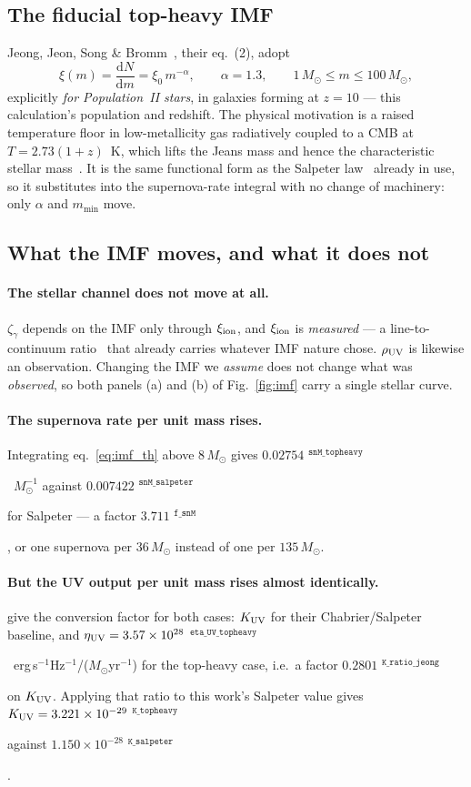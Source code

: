 \documentclass[11pt,a4paper]{article}
\newif\ifprovdraft
\newcommand{\src}[1]{%
  \ifprovdraft
    \ifmmode{}^{\text{\color{gray}\scriptsize\texttt{#1}}}%
    \else{\color{gray}\scriptsize$^{\texttt{#1}}$}%
    \fi
  \fi}
\begin{document}
\subsection{The fiducial top-heavy IMF}
Jeong, Jeon, Song \& Bromm~\cite{jeong25}, their eq.~(2), adopt
\begin{equation}
  \xi(m) = \frac{\mathrm{d}N}{\mathrm{d}m} = \xi_0\,m^{-\alpha},
  \qquad \alpha = 1.3, \qquad 1\,M_\odot \le m \le 100\,M_\odot ,
  \label{eq:imf_th}
\end{equation}
explicitly \emph{for Population~II stars}, in galaxies forming at $z=10$ ---
this calculation's population and redshift. The physical motivation is a raised
temperature floor in low-metallicity gas radiatively coupled to a CMB at
$T = 2.73(1+z)$~K, which lifts the Jeans mass and hence the characteristic
stellar mass~\cite{larson98}. It is the same functional form as the Salpeter
law~\cite{salpeter} already in use, so it substitutes into the supernova-rate
integral with no change of machinery: only $\alpha$ and $m_{\min}$ move.

\subsection{What the IMF moves, and what it does not}
\paragraph{The stellar channel does not move at all.} $\zeta_\gamma$ depends on
the IMF only through $\xi_{\rm ion}$, and $\xi_{\rm ion}$ is \emph{measured} ---
a line-to-continuum ratio~\cite{llerena25} that already carries whatever IMF
nature chose. $\rho_{\rm UV}$ is likewise an observation. Changing the IMF we
\emph{assume} does not change what was \emph{observed}, so both panels (a) and
(b) of Fig.~\ref{fig:imf} carry a single stellar curve.

\paragraph{The supernova rate per unit mass rises.} Integrating
eq.~\eqref{eq:imf_th} above $8\,M_\odot$ gives
$0.02754$\src{snM\_topheavy}~$M_\odot^{-1}$ against
$0.007422$\src{snM\_salpeter} for Salpeter --- a factor
$3.711$\src{f\_snM}, or one supernova per $36\,M_\odot$ instead of one per
$135\,M_\odot$.

\paragraph{But the UV output per unit mass rises almost identically.}
\cite{jeong25} give the conversion factor for both cases: $K_{\rm UV}$ for
their Chabrier/Salpeter baseline, and $\eta_{\rm UV} =
3.57\times10^{28}$\src{eta\_UV\_topheavy}~erg\,s$^{-1}$Hz$^{-1}$/($M_\odot$yr$^{-1}$)
for the top-heavy case, i.e.\ a factor
$0.2801$\src{K\_ratio\_jeong} on $K_{\rm UV}$. Applying that ratio to this
work's Salpeter value gives $K_{\rm UV} =
3.221\times10^{-29}$\src{K\_topheavy} against
$1.150\times10^{-28}$\src{K\_salpeter}.
\end{document}
